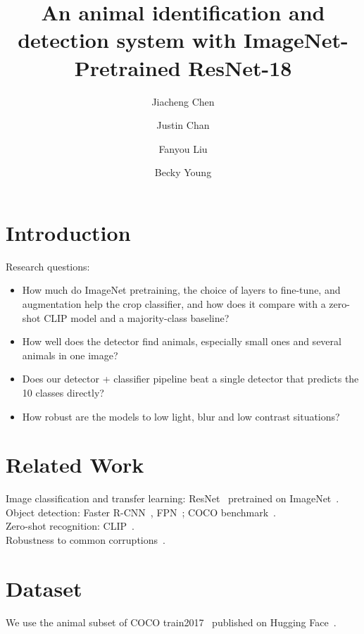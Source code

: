 \documentclass[11pt]{article}
\title{An animal identification and detection system with ImageNet-Pretrained ResNet-18}
\author{Jiacheng Chen \and Justin Chan \and Fanyou Liu \and Becky Young}
\date{}
\begin{document}
\maketitle

\begin{abstract}

\end{abstract}

\section{Introduction}

Research questions:
\begin{itemize}
  \item[RQ1] How much do ImageNet pretraining, the choice of layers to fine-tune, and augmentation help the crop
             classifier, and how does it compare with a zero-shot CLIP model and a majority-class baseline?
  \item[RQ2] How well does the detector find animals, especially small ones and several animals in one image?
  \item[RQ3] Does our detector + classifier pipeline beat a single detector that predicts the 10 classes directly?
  \item[RQ4] How robust are the models to low light, blur and low contrast situations?
\end{itemize}


\section{Related Work}
Image classification and transfer learning: ResNet~\cite{he2016deep} pretrained on ImageNet~\cite{deng2009imagenet}.\\
Object detection: Faster R-CNN~\cite{ren2015faster}, FPN~\cite{lin2017feature}; COCO
benchmark~\cite{lin2014microsoft}.\\
Zero-shot recognition: CLIP~\cite{radford2021learning}.\\
Robustness to common corruptions~\cite{hendrycks2019benchmarking}.\\

\section{Dataset}
\label{sec:dataset}
We use the animal subset of COCO train2017~\cite{lin2014microsoft} published on Hugging
Face~\cite{animaldataset}.
\end{document}
